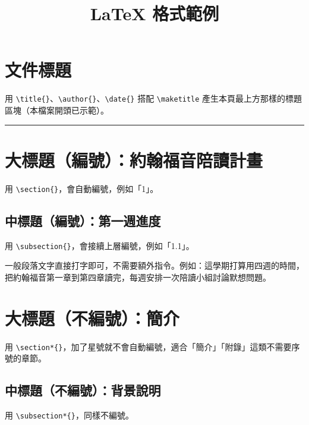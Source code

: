 \documentclass[12pt, a4paper]{article}
\title{LaTeX 格式範例}
\author{}
\date{}
\begin{document}
\maketitle

\section*{文件標題}
用 \verb|\title{}|、\verb|\author{}|、\verb|\date{}| 搭配 \verb|\maketitle| 產生本頁最上方那樣的標題區塊（本檔案開頭已示範）。

\bigskip
\hrule
\bigskip

\section{大標題（編號）：約翰福音陪讀計畫}
用 \verb|\section{}|，會自動編號，例如「1」。

\subsection{中標題（編號）：第一週進度}
用 \verb|\subsection{}|，會接續上層編號，例如「1.1」。

一般段落文字直接打字即可，不需要額外指令。例如：這學期打算用四週的時間，把約翰福音第一章到第四章讀完，每週安排一次陪讀小組討論默想問題。

\section*{大標題（不編號）：簡介}
用 \verb|\section*{}|，加了星號就不會自動編號，適合「簡介」「附錄」這類不需要序號的章節。

\subsection*{中標題（不編號）：背景說明}
用 \verb|\subsection*{}|，同樣不編號。
\end{document}
